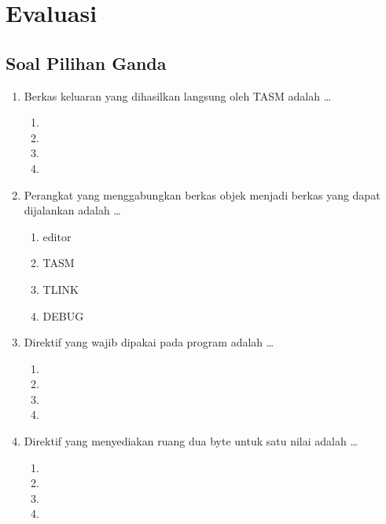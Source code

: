 \section{Evaluasi}
\label{sec:evaluasi-bab7}

\subsection{Soal Pilihan Ganda}

\begin{enumerate}
    \item Berkas keluaran yang dihasilkan langsung oleh TASM adalah
          \dots
          \begin{enumerate}
              \item {} \item {}
              \item {} \item {}
          \end{enumerate}

    \item Perangkat yang menggabungkan berkas objek menjadi berkas
          yang dapat dijalankan adalah \dots
          \begin{enumerate}
              \item editor \item TASM
              \item TLINK \item DEBUG
          \end{enumerate}

    \item Direktif yang wajib dipakai pada program 
          adalah \dots
          \begin{enumerate}
              \item {} \item {}
              \item {} \item {}
          \end{enumerate}

    \item Direktif yang menyediakan ruang dua byte untuk satu nilai
          adalah \dots
          \begin{enumerate}
              \item {} \item {}
              \item {} \item {}
          \end{enumerate}


\end{enumerate}
